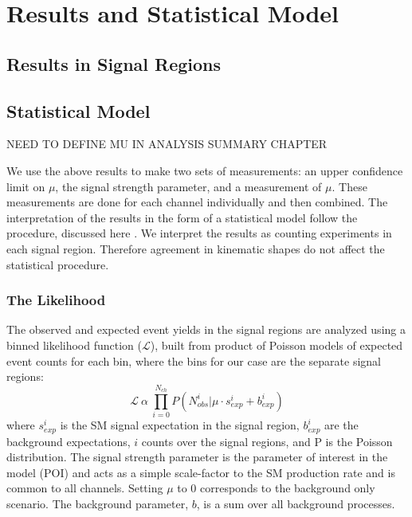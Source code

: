 \chapter[Results and Statistical Model][Results and Statistical Model]{Results and Statistical Model} 
\label{chapter:results} 


\section{Results in Signal Regions}



\section{Statistical Model}
NEED TO DEFINE MU IN ANALYSIS SUMMARY CHAPTER


We use the above results to make two sets of measurements: an upper confidence limit on $\mu$, the signal strength parameter, and a measurement of $\mu$. These measurements are done for each channel individually and then combined. 
The interpretation of the results in the form of a statistical model follow the procedure, discussed here \cite{asym}. We interpret the results as counting experiments in each signal region. Therefore agreement in kinematic shapes do not affect the statistical procedure. 




\subsection{The Likelihood} 
The observed and expected event yields in the signal regions are analyzed using a binned likelihood function ($\mathcal{L}$), built from product of Poisson models of expected event counts for each bin, where the bins for our case are the separate signal regions:
\begin{equation}
\mathcal{L}\ \alpha\  \prod_{i=0}^{N_{ch}} P(N_{obs}^{i}| \mu \cdot s_{exp}^{i} + b_{exp}^{i})
\end{equation}
where $s_{exp}^i$ is the SM signal expectation in the signal region, $b_{exp}^i$ are the background expectations, $i$ counts over the signal regions, and P is the Poisson distribution. The signal strength parameter is the parameter of interest in the model (POI) and acts as a simple scale-factor to the SM \tth production rate and is common to all channels. Setting $\mu$ to 0 corresponds to the background only scenario. The background parameter, $b$, is a sum over all background processes. 

